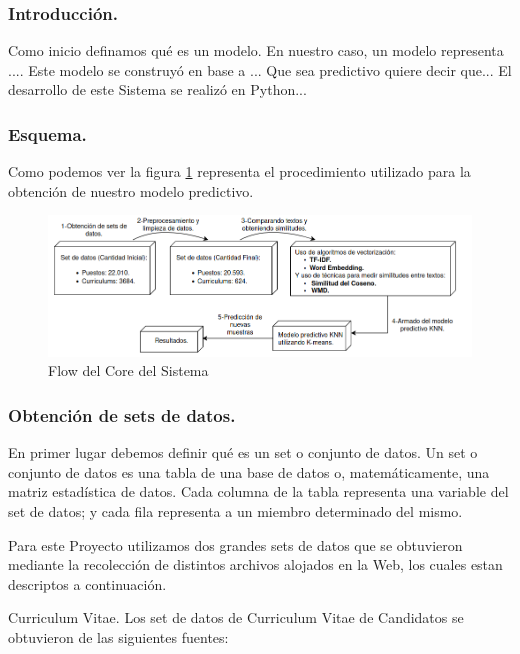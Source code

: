 \documentclass[12pt,a4paper]{article}
\makeatletter
\renewcommand\paragraph{\@startsection{paragraph}{4}{\z@}
            {-2.5ex\@plus -1ex \@minus -.25ex}
            {1.25ex \@plus .25ex}
            {\normalfont\normalsize\bfseries}}
\makeatother
\begin{document}
\subsubsection{Introducción.}
Como inicio definamos qué es un modelo. En nuestro caso, un modelo representa ....
Este modelo se construyó en base a ...
Que sea predictivo quiere decir que...
El desarrollo de este Sistema se realizó en Python...

\subsubsection{Esquema.}
Como podemos ver la figura \ref{fig:FlowCoreSystem} representa el procedimiento utilizado para la obtención de nuestro modelo predictivo. 

\begin{figure}[h]    %
  \centering
  \includegraphics[width=1\textwidth]{images/flow-core.png} 	%
  \caption{Flow del Core del Sistema}  
  \label{fig:FlowCoreSystem}
\end{figure}

\subsubsection{Obtención de sets de datos.}
En primer lugar debemos definir qué es un set o conjunto de datos.
Un set o conjunto de datos es una tabla de una base de datos o, matemáticamente, una matriz estadística de datos. Cada columna de la tabla representa una variable del set de datos; y cada fila representa a un miembro determinado del mismo.

Para este Proyecto utilizamos dos grandes sets de datos que se obtuvieron mediante la recolección de distintos archivos alojados en la Web, los cuales estan descriptos a continuación.

\paragraph{Curriculum Vitae.}
Los set de datos de Curriculum Vitae de Candidatos se obtuvieron de las siguientes fuentes:
\end{document}
